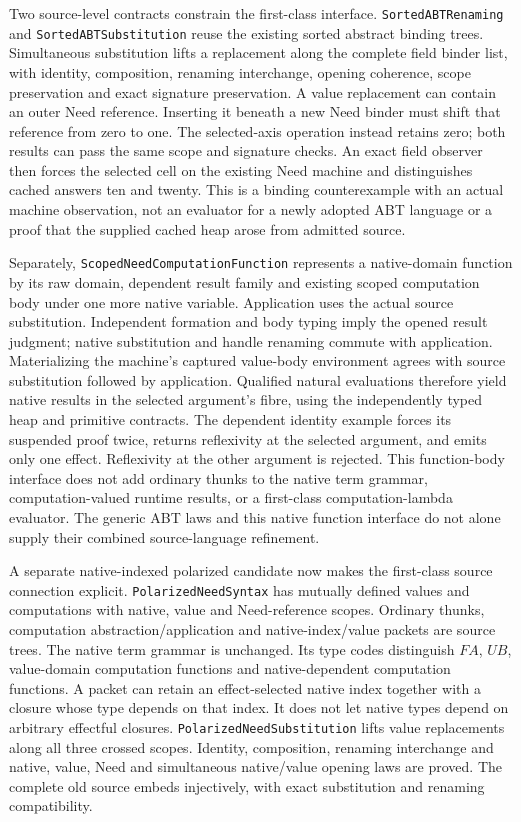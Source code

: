 \documentclass[11pt]{article}
\theoremstyle{definition}
\theoremstyle{remark}
\begin{document}
Two source-level contracts constrain the first-class interface.
\nolinkurl{SortedABTRenaming} and \nolinkurl{SortedABTSubstitution} reuse the
existing sorted abstract binding trees. Simultaneous substitution lifts a
replacement along the complete field binder list, with identity, composition,
renaming interchange, opening coherence, scope preservation and exact
signature preservation. A value replacement can contain an outer Need
reference. Inserting it beneath a new Need binder must shift that reference
from zero to one. The selected-axis operation instead retains zero; both
results can pass the same scope and signature checks. An exact field observer
then forces the selected cell on the existing Need machine and distinguishes
cached answers ten and twenty. This is a binding counterexample with an actual
machine observation, not an evaluator for a newly adopted ABT language or a
proof that the supplied cached heap arose from admitted source.

Separately, \nolinkurl{ScopedNeedComputationFunction} represents a native-domain
function by its raw domain, dependent result family and existing scoped
computation body under one more native variable. Application uses the actual
source substitution. Independent formation and body typing imply the opened
result judgment; native substitution and handle renaming commute with
application. Materializing the machine's captured value-body environment
agrees with source substitution followed by application. Qualified natural
evaluations therefore yield native results in the selected argument's fibre,
using the independently typed heap and primitive contracts. The dependent
identity example forces its suspended proof twice, returns reflexivity at
the selected argument, and emits only one effect. Reflexivity at the other
argument is rejected. This function-body interface does not add ordinary
thunks to the native term grammar, computation-valued runtime results, or
a first-class computation-lambda evaluator. The generic ABT laws and this
native function interface do not alone supply their combined source-language
refinement.

A separate native-indexed polarized candidate now makes the first-class
source connection explicit. \nolinkurl{PolarizedNeedSyntax} has mutually
defined values and computations with native, value and Need-reference scopes.
Ordinary thunks, computation abstraction/application and native-index/value
packets are source trees. The native term grammar is unchanged. Its type
codes distinguish $F A$, $U B$, value-domain computation functions and
native-dependent computation functions. A packet can retain an effect-selected
native index together with a closure whose type depends on that index.
It does not let native types depend on arbitrary effectful closures.
\nolinkurl{PolarizedNeedSubstitution} lifts value replacements along all
three crossed scopes. Identity, composition, renaming interchange and native,
value, Need and simultaneous native/value opening laws are proved. The complete
old source embeds injectively, with exact substitution and renaming compatibility.
\end{document}
